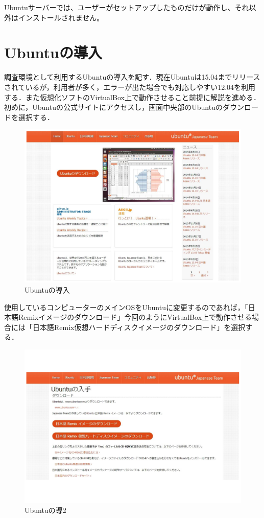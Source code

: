 Ubuntuサーバーでは、ユーザーがセットアップしたものだけが動作し、それ以外はインストールされません。\cite{ubuntu}

\section{Ubuntuの導入}
調査環境として利用するUbuntuの導入を記す．現在Ubuntuは15.04までリリースされているが，利用者が多く，エラーが出た場合でも対応しやすい12.04を利用する．また仮想化ソフトのVirtualBox上で動作させること前提に解説を進める．初めに，Ubuntuの公式サイトにアクセスし，画面中央部のUbuntuのダウンロードを選択する．

\begin{figure}[H]
\centering
\includegraphics[width=13cm]{figure8.pdf}
\caption{Ubuntuの導入}\label{sannp}
\end{figure}

使用しているコンピューターのメインOSをUbuntuに変更するのであれば，「日本語Remixイメージのダウンロード」今回のようにVirtualBox上で動作させる場合には「日本語Remix仮想ハードディスクイメージのダウンロード」を選択する．

\begin{figure}[H]
\centering
\includegraphics[width=13cm]{figure9.pdf}
\caption{Ubuntuの導2}\label{sannp}
\end{figure}


